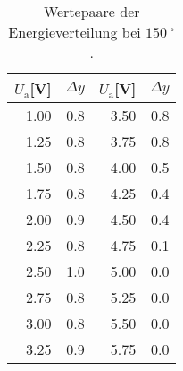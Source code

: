 
\begin{table}[!h]
\begin{center}
\begin{tabular}{|r|r|r|r|}
\hline
$U_\mathrm{a}$[V] & $\Delta y$ & $U_\mathrm{a}$[V] & $\Delta y$ \\
\hline
\hline

1.00 &	0.8  & 3.50 &	0.8  \\
1.25 &	0.8  & 3.75 &	0.8  \\
1.50 &	0.8  & 4.00 &	0.5  \\
1.75 &	0.8  & 4.25 &	0.4  \\
2.00 &	0.9  & 4.50 &	0.4  \\
2.25 &	0.8  & 4.75 &	0.1  \\
2.50 &	1.0  & 5.00 &	0.0  \\
2.75 &	0.8  & 5.25 &	0.0  \\
3.00 &	0.8  & 5.50 &	0.0  \\
3.25 &	0.9  & 5.75 &	0.0  \\

\hline
\end{tabular}
\caption[]{Wertepaare der Energieverteilung bei $\SI{150}{^\circ}$.}
\label{tab:a2}
\end{center}
\end{table}